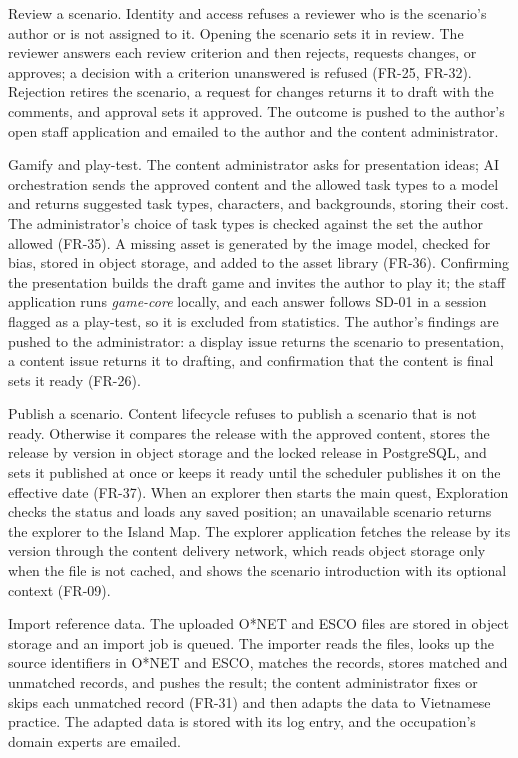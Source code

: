 Review a scenario. Identity and access refuses a reviewer who is the scenario's author or is not assigned to it. Opening the scenario sets it in review. The reviewer answers each review criterion and then rejects, requests changes, or approves; a decision with a criterion unanswered is refused (FR-25, FR-32). Rejection retires the scenario, a request for changes returns it to draft with the comments, and approval sets it approved. The outcome is pushed to the author's open staff application and emailed to the author and the content administrator.

Gamify and play-test. The content administrator asks for presentation ideas; AI orchestration sends the approved content and the allowed task types to a model and returns suggested task types, characters, and backgrounds, storing their cost. The administrator's choice of task types is checked against the set the author allowed (FR-35). A missing asset is generated by the image model, checked for bias, stored in object storage, and added to the asset library (FR-36). Confirming the presentation builds the draft game and invites the author to play it; the staff application runs \textit{game-core} locally, and each answer follows SD-01 in a session flagged as a play-test, so it is excluded from statistics. The author's findings are pushed to the administrator: a display issue returns the scenario to presentation, a content issue returns it to drafting, and confirmation that the content is final sets it ready (FR-26).

Publish a scenario. Content lifecycle refuses to publish a scenario that is not ready. Otherwise it compares the release with the approved content, stores the release by version in object storage and the locked release in PostgreSQL, and sets it published at once or keeps it ready until the scheduler publishes it on the effective date (FR-37). When an explorer then starts the main quest, Exploration checks the status and loads any saved position; an unavailable scenario returns the explorer to the Island Map. The explorer application fetches the release by its version through the content delivery network, which reads object storage only when the file is not cached, and shows the scenario introduction with its optional context (FR-09).

Import reference data. The uploaded O*NET and ESCO files are stored in object storage and an import job is queued. The importer reads the files, looks up the source identifiers in O*NET and ESCO, matches the records, stores matched and unmatched records, and pushes the result; the content administrator fixes or skips each unmatched record (FR-31) and then adapts the data to Vietnamese practice. The adapted data is stored with its log entry, and the occupation's domain experts are emailed.

